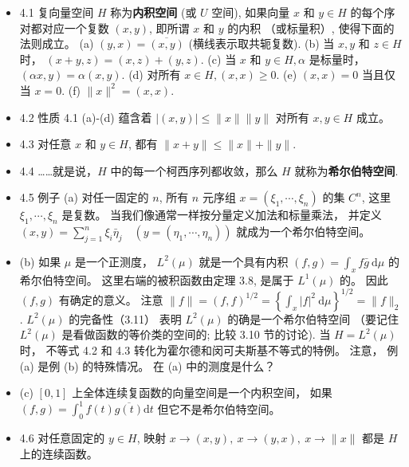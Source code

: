 \begin{itemize}
\item 4.1 复向量空间 $H$ 称为\textbf{内积空间} (或 $U$ 空间), 如果向量 $x$ 和 $y \in H$ 的每个序对都对应一个复数 $(x, y)$, 即所谓 $x$ 和 $y$ 的内积 （或标量积）, 使得下面的法则成立。 (a) $(y, x)=\overline{(x, y)}$ (横线表示取共轭复数). (b) 当 $x, y$ 和 $z \in H$ 时， $(x+y, z)=(x, z)+(y, z)$. (c) 当 $x$ 和 $y \in H, \alpha$ 是标量时， $(\alpha x, y)=\alpha(x, y)$. (d) 对所有 $x \in H,(x, x) \geqslant 0$. (e) $(x, x)=0$ 当且仅当 $x=0$. (f) $\|x\|^{2}=(x, x)$.

\item 4.2 性质 4.1 (a)-(d) 蕴含着 $|(x, y)| \leqslant\|x\|\|y\|$ 对所有 $x, y \in H$ 成立。

\item 4.3 对任意 $x$ 和 $y \in H$, 都有 $\|x+y\| \leqslant\|x\|+\|y\|$.

\item 4.4 ……就是说，$H$ 中的每一个柯西序列都收敛，那么 $H$ 就称为\textbf{希尔伯特空间}.

\item 4.5 例子 (a) 对任一固定的 $n$, 所有 $n$ 元序组 $x=\left(\xi_{1}, \cdots, \xi_{n}\right)$ 的集 $C^{n}$, 这里 $\xi_{1}, \cdots, \xi_{n}$ 是复数。 当我们像通常一样按分量定义加法和标量乘法， 并定义 $(x, y)=\sum_{j=1}^{n} \xi_{i} \bar{\eta}_{j} \quad\left(y=\left(\eta_{1}, \cdots, \eta_{n}\right)\right)$ 就成为一个希尔伯特空间。

\item (b) 如果 $\mu$ 是一个正测度， $L^{2}(\mu)$ 就是一个具有内积 $(f, g)=\int_{x} f \bar{g} \mathrm{~d} \mu$ 的希尔伯特空间。 这里右端的被积函数由定理 3.8, 是属于 $L^1(\mu)$ 的。 因此 $(f, g)$ 有确定的意义。 注意 $\|f\|=(f, f)^{1 / 2}=\left\{\int_{x}|f|^{2} \mathrm{~d} \mu\right\}^{1 / 2}=\|f\|_{2}$. $L^{2}(\mu)$ 的完备性（3.11） 表明 $L^{2}(\mu)$ 的确是一个希尔伯特空间 （要记住 $L^{2}(\mu)$ 是看做函数的等价类的空间的; 比较 3.10 节的讨论). 当 $H=L^{2}(\mu)$ 时， 不等式 4.2 和 4.3 转化为霍尔德和闵可夫斯基不等式的特例。 注意， 例 (a) 是例 (b) 的特殊情况。 在 (a) 中的测度是什么？

\item (c) $[0,1]$ 上全体连续复函数的向量空间是一个内积空间， 如果 $(f, g)=\int_{0}^{1} f(t) \overline{g(t)} \mathrm{d} t$ 但它不是希尔伯特空间。

\item 4.6 对任意固定的 $y \in H$, 映射 $x \rightarrow(x, y),\ x \rightarrow(y, x),\ x \rightarrow\|x\|$ 都是 $H$ 上的连续函数。


\end{itemize}
